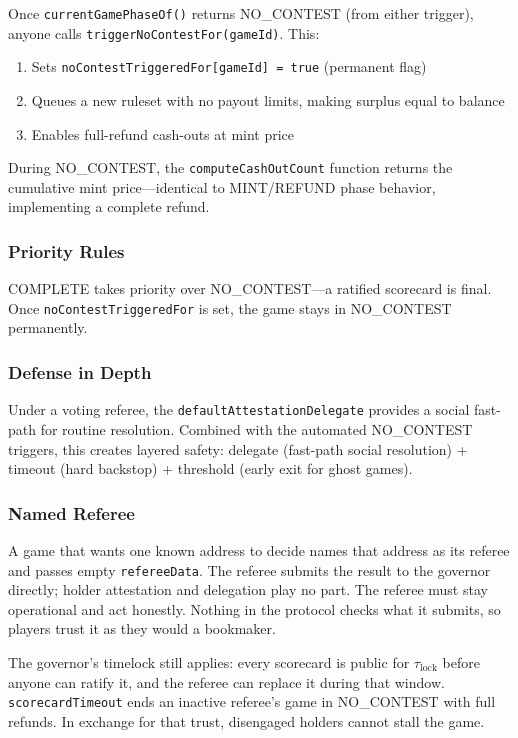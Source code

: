 \documentclass[11pt,a4paper]{article}
\begin{document}
Once \texttt{currentGamePhaseOf()} returns NO\_CONTEST (from either trigger), anyone calls \texttt{triggerNoContestFor(gameId)}. This:
\begin{enumerate}[nosep]
    \item Sets \texttt{noContestTriggeredFor[gameId] = true} (permanent flag)
    \item Queues a new ruleset with no payout limits, making surplus equal to balance
    \item Enables full-refund cash-outs at mint price
\end{enumerate}

During NO\_CONTEST, the \texttt{computeCashOutCount} function returns the cumulative mint price---identical to MINT/REFUND phase behavior, implementing a complete refund.

\subsubsection{Priority Rules}

COMPLETE takes priority over NO\_CONTEST---a ratified scorecard is final. Once \texttt{noContestTriggeredFor} is set, the game stays in NO\_CONTEST permanently.

\subsubsection{Defense in Depth}

Under a voting referee, the \texttt{defaultAttestationDelegate} provides a social fast-path for routine resolution. Combined with the automated NO\_CONTEST triggers, this creates layered safety: delegate (fast-path social resolution) + timeout (hard backstop) + threshold (early exit for ghost games).

\subsubsection{Named Referee}

A game that wants one known address to decide names that address as its referee and passes empty \texttt{refereeData}. The referee submits the result to the governor directly; holder attestation and delegation play no part. The referee must stay operational and act honestly. Nothing in the protocol checks what it submits, so players trust it as they would a bookmaker.

The governor's timelock still applies: every scorecard is public for $\tau_{\text{lock}}$ before anyone can ratify it, and the referee can replace it during that window. \texttt{scorecardTimeout} ends an inactive referee's game in NO\_CONTEST with full refunds. In exchange for that trust, disengaged holders cannot stall the game.
\end{document}
